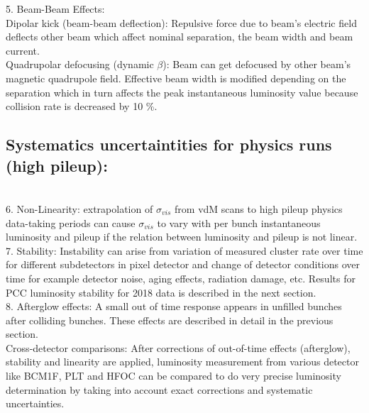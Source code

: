 5. Beam-Beam Effects: \\

Dipolar kick (beam-beam deflection): Repulsive force due to beam's electric field deflects other beam which affect nominal separation, the beam width and beam current. \\
Quadrupolar defocusing (dynamic $\beta$): Beam can get defocused by other beam's magnetic quadrupole field. Effective beam width is modified depending on the separation which in turn affects the peak instantaneous luminosity value because collision rate is decreased by 10 \%. \\

\subsection{Systematics uncertaintities for physics runs (high pileup):}\\

6. Non-Linearity: extrapolation of $\sigma_{vis}$ from vdM scans to high pileup physics data-taking periods can cause $\sigma_{vis}$ to vary with per bunch instantaneous luminosity and pileup if the relation between luminosity and pileup is not linear.                               \\

7. Stability: Instability can arise from variation of measured cluster rate over time for different subdetectors in pixel detector and change of detector conditions over time for example detector noise, aging effects, radiation damage, etc. Results for PCC luminosity stability for 2018 data is described in the next section.                               \\

8. Afterglow effects: A small out of time response appears in unfilled bunches after colliding bunches. These effects are described in detail in the previous section. \\


Cross-detector comparisons: After corrections of out-of-time effects (afterglow), stability and linearity are applied, luminosity measurement from various detector like BCM1F, PLT and HFOC can be compared to do very precise luminosity determination by taking into account exact corrections and systematic uncertainties\cite{CMS-PAS-LUM-18-002}. 



\clearpage\newpage
